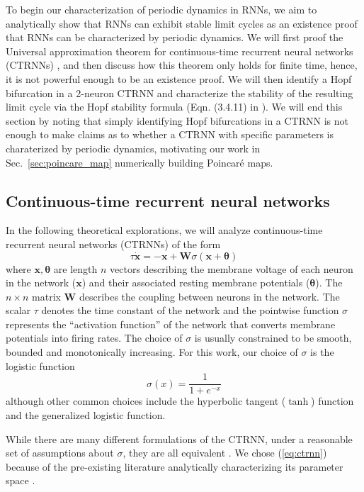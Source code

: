 \documentclass[11pt, letterpaper]{article}
\begin{document}
To begin our characterization of periodic dynamics in RNNs, we aim to analytically show that RNNs can exhibit stable limit cycles as an existence proof that RNNs can be characterized by periodic dynamics. We will first proof the Universal approximation theorem for continuous-time recurrent neural networks (CTRNNs) \citep{funahashi1993approximation}, and then discuss how this theorem only holds for finite time, hence, it is not powerful enough to be an existence proof. We will then identify a Hopf bifurcation in a 2-neuron CTRNN and characterize the stability of the resulting limit cycle via the Hopf stability formula (Eqn. (3.4.11) in \citet{guckenhiemerholmes}). We will end this section by noting that simply identifying Hopf bifurcations in a CTRNN is not enough to make claims as to whether a CTRNN with specific parameters is charaterized by periodic dynamics, motivating our work in Sec.~\ref{sec:poincare_map} numerically building Poincaré maps.

\subsection{Continuous-time recurrent neural networks}

In the following theoretical explorations, we will analyze continuous-time recurrent neural networks (CTRNNs) of the form
\begin{equation}\label{eq:ctrnn}
    \tau\mathbf{\dot{x}}=-\mathbf{x}+\mathbf{W}\sigma\left( \mathbf{x} + \mathbf{\theta} \right)
\end{equation}
where $\mathbf{x},\mathbf{\theta}$ are length $n$ vectors describing the membrane voltage of each neuron in the network ($\mathbf{x}$) and their associated resting membrane potentials ($\mathbf{\theta}$). The $n\times n$ matrix $\mathbf{W}$ describes the coupling between neurons in the network. The scalar $\tau$ denotes the time constant of the network and the pointwise function $\sigma$ represents the ``activation function'' of the network that converts membrane potentials into firing rates. The choice of $\sigma$ is usually constrained to be smooth, bounded and monotonically increasing. For this work, our choice of $\sigma$ is the logistic function 
\begin{equation}\label{eq:activationfunciton}
    \sigma(x)=\frac{1}{1+e^{-x}}
\end{equation}
although other common choices include the hyperbolic tangent ($\tanh$) function and the generalized logistic function.

While there are many different formulations of the CTRNN, under a reasonable set of assumptions about $\sigma$, they are all equivalent \citep{miller2012mathematical}. We chose (\ref{eq:ctrnn}) because of the pre-existing literature analytically characterizing its parameter space \citep{beer1995dynamics,beer2006parameter,beer2022codimension}.
\end{document}
